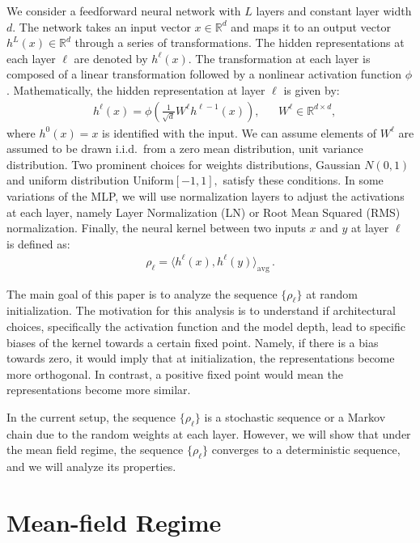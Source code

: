 \documentclass[twoside]{article}
\newcommand{\avg}{\mathrm{avg}}
\theoremstyle{definition}
\begin{document}
We consider a feedforward neural network with $L$ layers and constant layer width $d$. The network takes an input vector $x \in \mathbb{R}^d$ and maps it to an output vector $h^L(x) \in \mathbb{R}^d$ through a series of transformations. The hidden representations at each layer $\ell$ are denoted by $h^\ell(x)$. The transformation at each layer is composed of a linear transformation followed by a nonlinear activation function $\phi$. Mathematically, the hidden representation at layer $\ell$ is given by:
\begin{align}
& h^\ell(x) = \phi\left(\frac{1}{\sqrt{d}}W^\ell h^{\ell-1}(x)\right), && W^\ell \in \mathbb{R}^{d \times d},
\end{align}
where $h^0(x)=x$ is identified with the input. We can assume elements of $W^\ell$ are assumed to be drawn i.i.d.~from a zero mean distribution, unit variance distribution. Two prominent choices for weights distributions, Gaussian $N(0,1)$ and uniform distribution $\text{Uniform}[-1,1],$ satisfy these conditions. In some variations of the MLP, we will use normalization layers to adjust the activations at each layer, namely Layer Normalization (LN) or Root Mean Squared (RMS) normalization. Finally, the neural kernel between two inputs $x$ and $y$ at layer $\ell$ is defined as:
\begin{align}
    \rho_\ell = \langle h^\ell(x), h^\ell(y) \rangle_\avg \,.
\end{align}

The main goal of this paper is to analyze the sequence $\{\rho_\ell\}$ at random initialization. The motivation for this analysis is to understand if architectural choices, specifically the activation function and the model depth, lead to specific biases of the kernel towards a certain fixed point. Namely, if there is a bias towards zero, it would imply that at initialization, the representations become more orthogonal. In contrast, a positive fixed point would mean the representations become more similar.

In the current setup, the sequence $\{\rho_\ell\}$ is a stochastic sequence or a Markov chain due to the random weights at each layer. However, we will show that under the mean field regime, the sequence $\{\rho_\ell\}$ converges to a deterministic sequence, and we will analyze its properties.


\section{Mean-field Regime}
\end{document}
